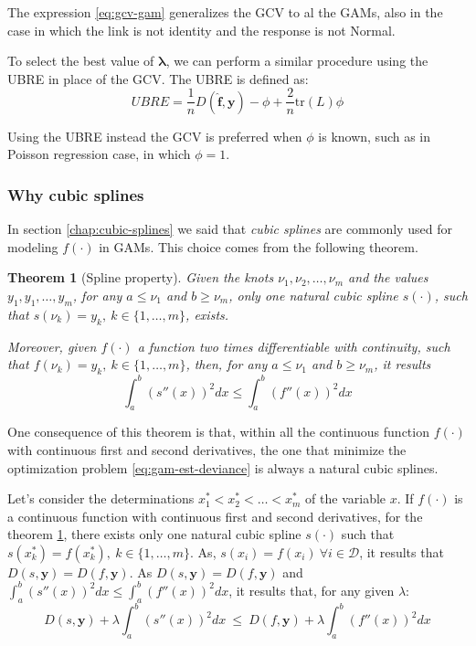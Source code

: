 \documentclass[a4paper, nobind]{templates/ociamthesis}
\newtheorem{theorem}{Theorem}[chapter]
\theoremstyle{definition}
\theoremstyle{definition}
\theoremstyle{definition}
\theoremstyle{remark}
\begin{document}
The expression \eqref{eq:gcv-gam} generalizes the GCV to al the GAMs, also in the case in which the link is not identity and the response is not Normal.

To select the best value of \(\boldsymbol{\lambda}\), we can perform a similar procedure using the UBRE in place of the GCV. The UBRE is defined as:
\[
UBRE = \frac{1}{n} D(\boldsymbol{\hat{f}}, \boldsymbol{y}) - \phi + \frac{2}{n} \text{tr}(L)\phi 
\]

Using the UBRE instead the GCV is preferred when \(\phi\) is known, such as in Poisson regression case, in which \(\phi=1\).

\hypertarget{why-cubic-splines}{%
\subsubsection{Why cubic splines}\label{why-cubic-splines}}

In section \ref{chap:cubic-splines} we said that \emph{cubic splines} are commonly used for modeling \(f(\cdot)\) in GAMs. This choice comes from the following theorem.

\begin{theorem}[Spline property]
\label{thm:th-splines-property} \iffalse (Spline property) \fi{} Given the knots \(\nu_1, \nu_2, \dots, \nu_m\) and the values \(y_1, y_1, \dots, y_m\), for any \(a\le\nu_1\) and \(b\ge\nu_m\), only one natural cubic spline \(s(\cdot)\), such that \(s(\nu_k)=y_k, \ k\in \{1, \dots, m\}\), exists.

Moreover, given \(f(\cdot)\) a function two times differentiable with continuity, such that \(f(\nu_k)=y_k, \ k\in \{1, \dots, m\}\), then, for any \(a\le\nu_1\) and \(b\ge\nu_m\), it results
\[
\int_a^b{\left( s''(x)\right)^2 dx} \le \int_a^b{\left( f''(x)\right)^2 dx}
\]
\end{theorem}
One consequence of this theorem is that, within all the continuous function \(f(\cdot)\) with continuous first and second derivatives, the one that minimize the optimization problem \eqref{eq:gam-est-deviance} is always a natural cubic splines.

Let's consider the determinations \(x_1^* < x_2^* < \dots < x_m^*\) of the variable \(x\). If \(f(\cdot)\) is a continuous function with continuous first and second derivatives, for the theorem \ref{thm:th-splines-property}, there exists only one natural cubic spline \(s(\cdot)\) such that \(s(x_k^*) = f(x_k^*), \ k\in \{1, \dots, m\}\). As, \(s(x_i)=f(x_i) \ \forall i \in \mathcal{D}\), it results that \(D(s, \boldsymbol{y}) = D(f, \boldsymbol{y})\). As \(D(s, \boldsymbol{y}) = D(f, \boldsymbol{y})\) and \(\int_a^b{\left( s''(x)\right)^2 dx} \le \int_a^b{\left( f''(x)\right)^2 dx}\), it results that, for any given \(\lambda\):
\[
D(s, \boldsymbol{y}) + \lambda \int_{a}^{b}{\left( s''(x) \right)^2 dx}
\ \le \ 
D(f, \boldsymbol{y}) + \lambda \int_{a}^{b}{\left( f''(x) \right)^2 dx}
\]
\end{document}
